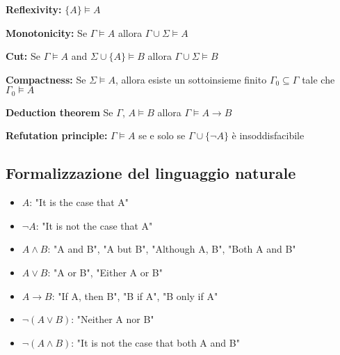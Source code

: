 \textbf{Reflexivity:} $\lbrace A \rbrace \models A$

\textbf{Monotonicity:} Se $\Gamma \models A$ allora $\Gamma \cup \Sigma \models A$

\textbf{Cut:} Se $\Gamma \models A$ and $\Sigma \cup \lbrace A \rbrace \models B$ allora $\Gamma \cup \Sigma \models B$

\textbf{Compactness:} Se $\Sigma \models A$, allora esiste un sottoinsieme finito $\Gamma_0 \subseteq \Gamma$ tale che $\Gamma_0 \models A$

\textbf{Deduction theorem} Se $\Gamma$, $A \models B$ allora $\Gamma \models A \to B$

\textbf{Refutation principle:} $\Gamma \models A$ se e solo se $\Gamma \cup \lbrace \lnot A \rbrace$ è insoddisfacibile

\subsection{Formalizzazione del linguaggio naturale}

\begin{itemize}
\item $A$: "It is the case that A"
\item $\lnot A$: "It is not the case that A"
\item $A \land B$: "A and B", "A but B", "Although A, B", "Both A and B"
\item $A \lor B$: "A or B", "Either A or B"
\item $A \to B$: "If A, then B", "B if A", "B only if A"
\item $\lnot (A \lor B)$: "Neither A nor B"
\item $\lnot (A \land B)$: "It is not the case that both A and B"
\end{itemize}
